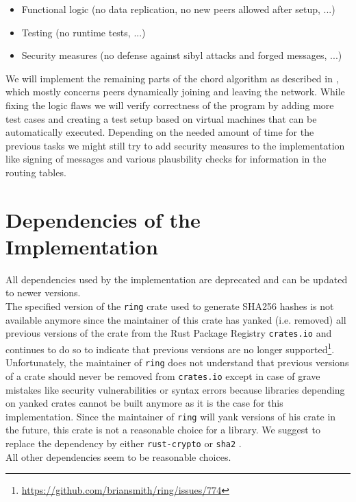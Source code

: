 \documentclass[a4paper, 11pt]{article}
\begin{document}
\begin{itemize}
	\item Functional logic (no data replication, no new peers allowed after setup, ...)
	\item Testing (no runtime tests, ...)
	\item Security measures (no defense against sibyl attacks and forged messages, ...)
\end{itemize}

We will implement the remaining parts of the chord algorithm as described in \cite{stoica2001chord}, which mostly concerns peers dynamically joining and leaving the network. 
While fixing the logic flaws we will verify correctness of the program by adding more test cases and creating a test setup based on virtual machines that can be automatically executed.
Depending on the needed amount of time for the previous tasks we might still try to add security measures to the implementation like signing of messages and various plausbility checks for information in the routing tables.


\section*{Dependencies of the Implementation}
All dependencies used by the implementation are deprecated and can be updated to newer versions.\\
The specified version of the \texttt{ring} \cite{CratesIORing} crate used to generate SHA256 hashes is not available anymore since the maintainer of this crate has yanked (i.e. removed) all previous versions of the crate from the Rust Package Registry \texttt{crates.io} \cite{CratesIO} and continues to do so to indicate that previous versions are no longer supported\footnote{\url{https://github.com/briansmith/ring/issues/774}}.
Unfortunately, the maintainer of \texttt{ring} does not understand that previous versions of a crate should never be removed from \texttt{crates.io} except in case of grave mistakes like security vulnerabilities or syntax errors because libraries depending on yanked crates cannot be built anymore as it is the case for this implementation.
Since the maintainer of \texttt{ring} will yank versions of his crate in the future, this crate is not a reasonable choice for a library.
We suggest to replace the dependency by either \texttt{rust-crypto} \cite{CratesIOCrypto} or \texttt{sha2} \cite{CratesIOSha2}.\\
All other dependencies seem to be reasonable choices.
\end{document}
